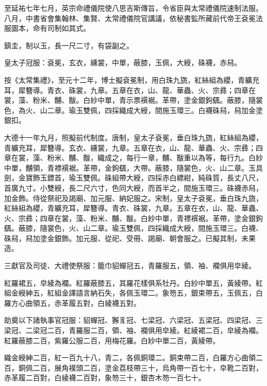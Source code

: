 \begin{pinyinscope}
 至延祐七年七月，英宗命禮儀院使八思吉斯傳旨，令省臣與太常禮儀院速制法服。八月，中書省會集翰林、集賢、太常禮儀院官講議，依秘書監所藏前代帝王袞冕法服圖本，命有司制如其式。



 鎮圭，制以玉，長一尺二寸，有袋副之。



 皇太子冠服：袞冕，玄衣，纁裳，中單，蔽膝，玉佩，大綬，硃襪，赤舄。



 按《太常集禮》，至元十二年，博士擬袞冕制，用白珠九旒，紅絲組為纓，青纊充耳，犀簪導。青衣、硃裳，九章。五章在衣，山、龍、華蟲、火、宗彞；四章在裳，藻、粉米、黼、黻。白紗中單，青示票襈裾。革帶，塗金銀鉤颻。蔽膝，隨裳色，為火、山二章。瑜玉雙佩，四採織成大綬，間施玉環三。白襪硃舄，舄加金塗銀扣。



 大德十一年九月，照擬前代制度。唐制，皇太子袞冕，垂白珠九旒，紅絲組為纓，青纊充耳，犀簪導。玄衣、纁裳，九章。五章在衣，山、龍、華蟲、火、宗彞；四章在裳，藻、粉米、黼、黻，織成之，每行一章，黼、黻重以為等，每行九。白紗中單，黼領，青褾襈裾。革帶，金鉤颻，大帶。蔽膝，隨裳色，火、山二章。玉具劍，金寶飾玉鏢首，瑜玉雙佩。硃組帶大綬，四採赤白縹紺，純硃質，長丈八尺，首廣九寸。小雙綬，長二尺六寸，色同大綬，而首半之，間施玉環三。硃襪赤舄，加金飾。侍從祭祀及謁廟、加元服、納妃服之。宋制，皇太子袞冕，垂白珠九旒，紅絲組為纓，青纊充耳，犀簪導。青衣、硃裳，九章。五章在衣，山、龍、華蟲、火、宗彞；四章在裳，藻、粉米、黼、黻。白紗中單，青褾襈裾。革帶，塗金銀鉤颻。蔽膝，隨裳色，火、山二章。瑜玉雙佩，四採織成大綬，間施玉環三。白襪、硃舄，舄加塗金銀飾。加元服、從祀、受冊、謁廟、朝會服之。已擬其制，未果造。



 三獻官及司徒、大禮使祭服：籠巾貂蟬冠五，青羅服五，領、袖、襴俱用皁綾。



 紅羅裙五，皁綾為襴。紅羅蔽膝五，其羅花樣俱系牡丹。白紗中單五，黃綾帶。紅組金綬紳五，紅組金譯語言納石失，各佩玉環二。象笏五，銀束帶五，玉佩五，白羅方心曲領五，赤革履五對，白綾襪五對。



 助奠以下諸執事官冠服：貂蟬冠、獬豸冠、七梁冠、六梁冠、五梁冠、四梁冠、三梁冠、二梁冠二百，青羅服二百，領、袖、襴俱用皁綾。紅綾裙二百，皁綾為襴。紅羅蔽膝二百，紫羅公服二百，用梅花羅。白紗中單二百，黃綾帶。



 織金綬紳二百，紅一百九十八，青二，各佩銅環二。銅束帶二百，白羅方心曲領二百，銅佩二百，展角襆頭二百，塗金荔枝帶三十，烏角帶一百七十，皁靴二百對，赤革履二百對，白綾襪二百對，象笏三十，銀杏木笏一百七十。




\end{pinyinscope}
